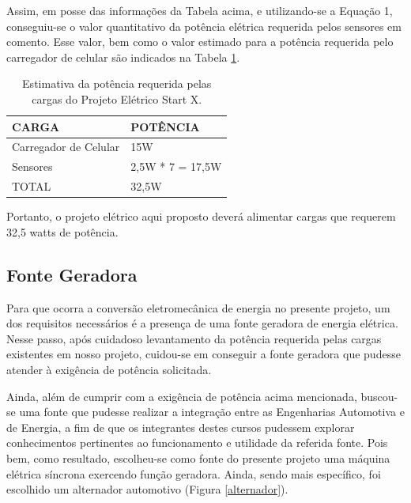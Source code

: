 Assim, em posse das informações da Tabela acima, e utilizando-se a Equação 1, conseguiu-se o valor quantitativo da potência elétrica requerida pelos sensores em comento. Esse valor, bem como o valor estimado para a potência requerida pelo carregador de celular são indicados na Tabela \ref{estimativa-requerida}. 

\begin{table}[h]
\centering
\begin{tabular}{|l|l|}
\hline
\rowcolor[HTML]{329A9D} 
CARGA                                                           & POTÊNCIA                                                   \\ \hline
Carregador de Celular                                           & 15W   
\\ \hline
Sensores                                                        & 2,5W * 7 = 17,5W 
\\ \hline
TOTAL                                                           & 32,5W                                                      \\ \hline
\end{tabular}
\caption{Estimativa da potência requerida pelas cargas do Projeto Elétrico Start X.}
\label{estimativa-requerida}
\end{table}
	
Portanto, o projeto elétrico aqui proposto deverá alimentar cargas que requerem 32,5 watts de potência.

\subsection{Fonte Geradora}
\label{fonte-geradora}

Para que ocorra a conversão eletromecânica de energia no presente projeto, um dos requisitos necessários é a presença de uma fonte geradora de energia elétrica. Nesse passo, após cuidadoso levantamento da potência requerida pelas cargas existentes em nosso projeto, cuidou-se em conseguir a fonte geradora que pudesse atender à exigência de potência solicitada.

Ainda, além de cumprir com a exigência de potência acima mencionada, buscou-se uma fonte que pudesse realizar a integração entre as Engenharias Automotiva e de Energia, a fim de que os integrantes destes cursos pudessem explorar conhecimentos pertinentes ao funcionamento e utilidade da referida fonte.
Pois bem, como resultado, escolheu-se como fonte do presente projeto uma máquina elétrica síncrona exercendo função geradora. Ainda, sendo mais específico, foi escolhido um alternador automotivo (Figura \ref{alternador}).

